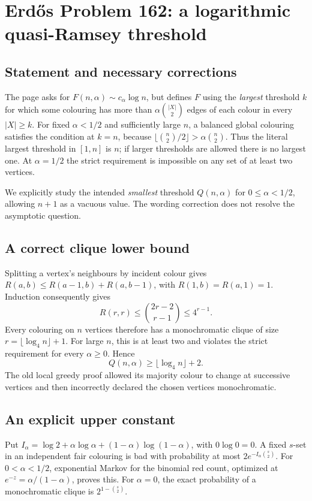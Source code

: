 \section*{Erd\H{o}s Problem 162: a logarithmic quasi-Ramsey threshold}
\subsection*{Statement and necessary corrections}
The page asks for $F(n,\alpha)\sim c_\alpha\log n$, but defines $F$ using the \emph{largest} threshold $k$ for which some colouring has more than $\alpha\binom{|X|}{2}$ edges of each colour in every $|X|\ge k$.
For fixed $\alpha<1/2$ and sufficiently large $n$, a balanced global colouring satisfies the condition at $k=n$, because
$\lfloor\binom n2/2\rfloor>\alpha\binom n2$.
Thus the literal largest threshold in $[1,n]$ is $n$; if larger thresholds are allowed there is no largest one. At $\alpha=1/2$ the strict requirement is impossible on any set of at least two vertices.

We explicitly study the intended \emph{smallest} threshold $Q(n,\alpha)$ for $0\le\alpha<1/2$, allowing $n+1$ as a vacuous value. The wording correction does not resolve the asymptotic question.

\subsection*{A correct clique lower bound}
Splitting a vertex's neighbours by incident colour gives
$R(a,b)\le R(a-1,b)+R(a,b-1)$, with
$R(1,b)=R(a,1)=1$. Induction consequently gives
\[
 R(r,r)\le\binom{2r-2}{r-1}\le4^{r-1}.
\]
Every colouring on $n$ vertices therefore has a monochromatic clique of size
$r=\lfloor\log_4 n\rfloor+1$. For large $n$, this is at least two and violates the strict requirement for every $\alpha\ge0$. Hence
\[
 Q(n,\alpha)\ge\lfloor\log_4 n\rfloor+2. \tag{1}
\]
The old local greedy proof allowed its majority colour to change at successive vertices and then incorrectly declared the chosen vertices monochromatic.

\subsection*{An explicit upper constant}
Put $I_\alpha=\log2+\alpha\log\alpha+(1-\alpha)\log(1-\alpha)$, with $0\log0=0$. A fixed $s$-set in an independent fair colouring is bad with probability at most
$2e^{-I_\alpha\binom s2}$. For $0<\alpha<1/2$, exponential Markov for the binomial red count, optimized at $e^{-z}=\alpha/(1-\alpha)$, proves this. For $\alpha=0$, the exact probability of a monochromatic clique is $2^{1-\binom s2}$.

